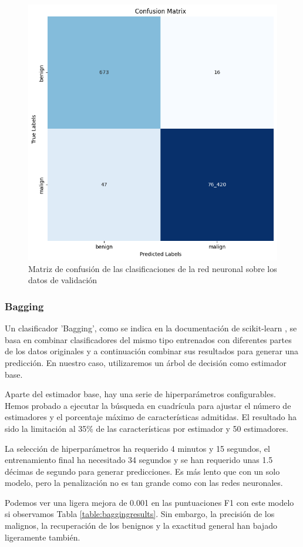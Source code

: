 \begin{figure}[H]
    \begin{center}
        \includegraphics[width=0.55\linewidth]{media/packet_pincer_train_models_voting_classifier.png}
    \end{center}
    \caption{Matriz de confusión de las clasificaciones de la red neuronal sobre los datos de validación}\label{fig:votingmatrix}
\end{figure}

\subsubsection{Bagging} %

Un clasificador 'Bagging', como se indica en la documentación de scikit-learn \cite{sklearnbagging}, se basa en combinar clasificadores del mismo tipo entrenados con diferentes partes de los datos originales y a continuación combinar sus resultados para generar una predicción. En nuestro caso, utilizaremos un árbol de decisión como estimador base.

Aparte del estimador base, hay una serie de hiperparámetros configurables. Hemos probado a ejecutar la búsqueda en cuadrícula para ajustar el número de estimadores y el porcentaje máximo de características admitidas. El resultado ha sido la limitación al 35\% de las características por estimador y 50 estimadores.

La selección de hiperparámetros ha requerido 4 minutos y 15 segundos, el entrenamiento final ha necesitado 34 segundos y se han requerido unas 1.5 décimas de segundo para generar predicciones. Es más lento que con un solo modelo, pero la penalización no es tan grande como con las redes neuronales.

Podemos ver una ligera mejora de 0.001 en las puntuaciones F1 con este modelo si observamos Tabla \ref{table:baggingresults}. Sin embargo, la precisión de los malignos, la recuperación de los benignos y la exactitud general han bajado ligeramente también.

